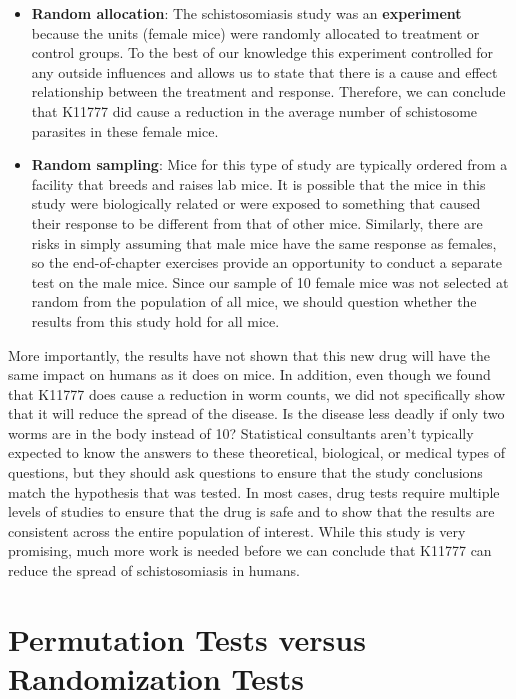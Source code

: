 \documentclass[
]{book}
\begin{document}
\begin{itemize}
\item  {\textbf{Random allocation}: The schistosomiasis study was an \textbf{experiment} because the units (female mice) were randomly allocated to treatment or control groups. To the best of our knowledge this experiment controlled for any outside influences and allows us to state that there is a cause and effect relationship between the treatment and response. Therefore, we can conclude that K11777 did cause a reduction in the average number of schistosome parasites in these female mice.}

\item {\textbf{Random sampling}: Mice for this type of study are typically ordered from a facility that breeds and raises lab mice. It is possible that the mice in this study were biologically related or were exposed to something that caused their response to be different from that of other mice. Similarly, there are risks in simply assuming that male mice have the same response as females, so the end-of-chapter exercises provide an opportunity to conduct a separate test on the male mice. Since our sample of 10 female mice was not selected at random from the population of all mice, we should question whether the results from this study hold for all mice.}
\end{itemize}

More importantly, the results have not shown that this new drug will have the same impact on humans as it does on mice. In addition, even though we found that K11777 does cause a reduction in worm counts, we did not specifically show that it will reduce the spread of the disease. Is the disease less deadly if only two worms are in the body instead of 10? Statistical consultants aren't typically expected to know the answers to
these theoretical, biological, or medical types of questions, but they should ask questions to ensure that the study conclusions match the hypothesis that was tested. In most cases, drug tests require multiple levels of studies to ensure that the drug is safe and to show that the results are consistent across the entire population of
interest. While this study is very promising, much more work is needed before we can conclude that K11777 can reduce the spread of schistosomiasis in humans.

\hypertarget{permutation-tests-versus-randomization-tests}{%
\section{Permutation Tests versus Randomization Tests}\label{permutation-tests-versus-randomization-tests}}
\end{document}
